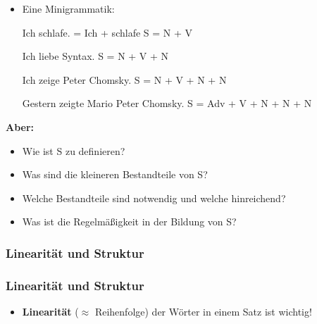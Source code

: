 \begin{frame}

\begin{itemize}
	\item Eine Minigrammatik:

	\eal 
	\ex Ich schlafe. = Ich + schlafe
\pause	
	\ex	S = N + V 
	\zl

\pause
	
	\eal 
	\ex Ich liebe Syntax.
\pause
	\ex S = N + V + N
	\zl

\pause
		
	\eal 
	\ex Ich zeige Peter Chomsky.
\pause
	\ex S = N + V + N + N 
	\zl
	
\pause
	
	\eal 
	\ex Gestern zeigte Mario Peter Chomsky.
\pause
	\ex S = Adv + V + N + N + N 
	\zl

\end{itemize}

\end{frame}


\begin{frame}

\textbf{Aber: }
	\begin{itemize}
		\item Wie ist S zu definieren?
		\item Was sind die kleineren Bestandteile von S?
		\item Welche Bestandteile sind notwendig und welche hinreichend?
		\item Was ist die Regelmäßigkeit in der Bildung von S?
	\end{itemize}	 	

\end{frame}

\subsubsection{Linearität und Struktur}



\begin{frame}
\frametitle{Linearität und Struktur}

\begin{itemize}
	\item \textbf{Linearität} ($\approx$ Reihenfolge) der Wörter in einem Satz ist wichtig!
	
	\z
	
	\z

\end{itemize}

\end{frame}

